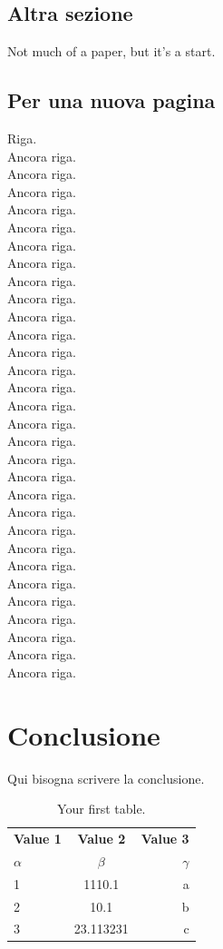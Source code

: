\documentclass[10pt, twoside, openany]{book}
\begin{document}
\section{Altra sezione}
Not much of a paper, but it's a start.

\section{Per una nuova pagina}
Riga.\\
Ancora riga.\\
Ancora riga.\\
Ancora riga.\\
Ancora riga.\\
Ancora riga.\\
Ancora riga.\\
Ancora riga.\\
Ancora riga.\\
Ancora riga.\\
Ancora riga.\\
Ancora riga.\\
Ancora riga.\\
Ancora riga.\\
Ancora riga.\\
Ancora riga.\\
Ancora riga.\\
Ancora riga.\\
Ancora riga.\\
Ancora riga.\\
Ancora riga.\\
Ancora riga.\\
Ancora riga.\\
Ancora riga.\\
Ancora riga.\\
Ancora riga.\\
Ancora riga.\\
Ancora riga.\\
Ancora riga.\\
Ancora riga.\\
Ancora riga.

\chapter{Conclusione}
Qui bisogna scrivere la conclusione.\\
\begin{table}[h!]
  \begin{center}
    \caption{Your first table.}
    \label{tab:table1}
    \begin{tabular}{l|c|r} %
      \textbf{Value 1} & \textbf{Value 2} & \textbf{Value 3}\\
      $\alpha$ & $\beta$ & $\gamma$ \\
      \hline
      1 & 1110.1 & a\\
      2 & 10.1 & b\\
      3 & 23.113231 & c\\
    \end{tabular}
  \end{center}
\end{table}
\end{document}
